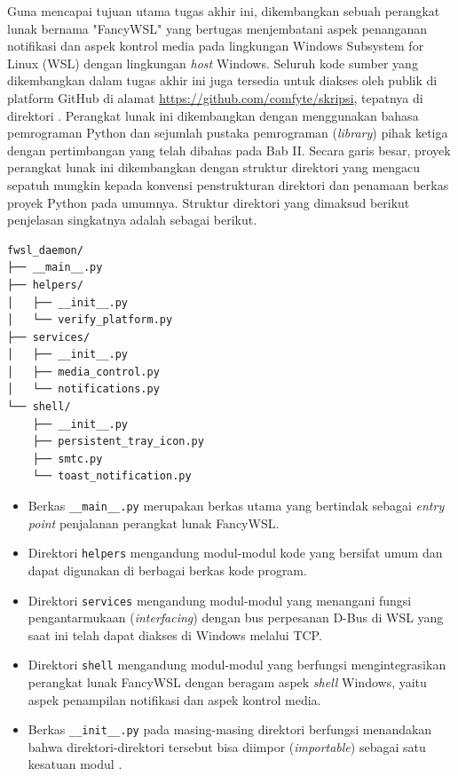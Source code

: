 Guna mencapai tujuan utama tugas akhir ini, dikembangkan sebuah perangkat lunak bernama "FancyWSL" yang bertugas menjembatani aspek penanganan notifikasi dan aspek kontrol media pada lingkungan Windows Subsystem for Linux (WSL) dengan lingkungan \textit{host} Windows. Seluruh kode sumber yang dikembangkan dalam tugas akhir ini juga tersedia untuk diakses oleh publik di platform GitHub di alamat \href{https://github.com/comfyte/skripsi}{https://github.com/comfyte/skripsi}, tepatnya di direktori . Perangkat lunak ini dikembangkan dengan menggunakan bahasa pemrograman Python dan sejumlah pustaka pemrograman (\textit{library}) pihak ketiga dengan pertimbangan yang telah dibahas pada Bab II. Secara garis besar, proyek perangkat lunak ini dikembangkan dengan struktur direktori yang mengacu sepatuh mungkin kepada konvensi penstrukturan direktori dan penamaan berkas proyek Python pada umumnya. Struktur direktori yang dimaksud berikut penjelasan singkatnya adalah sebagai berikut.

\begin{verbatim}
fwsl_daemon/
├── __main__.py
├── helpers/
│   ├── __init__.py
│   └── verify_platform.py
├── services/
│   ├── __init__.py
│   ├── media_control.py
│   └── notifications.py
└── shell/
    ├── __init__.py
    ├── persistent_tray_icon.py
    ├── smtc.py
    └── toast_notification.py
\end{verbatim}

\begin{itemize}
    \item Berkas \verb|__main__.py| merupakan berkas utama yang bertindak sebagai \textit{entry point} penjalanan perangkat lunak FancyWSL.

    \item Direktori \verb|helpers| mengandung modul-modul kode yang bersifat umum dan dapat digunakan di berbagai berkas kode program.

    \item Direktori \verb|services| mengandung modul-modul yang menangani fungsi pengantarmukaan (\textit{interfacing}) dengan bus perpesanan D-Bus di WSL yang saat ini telah dapat diakses di Windows melalui TCP.

    \item Direktori \verb|shell| mengandung modul-modul yang berfungsi mengintegrasikan perangkat lunak FancyWSL dengan beragam aspek \textit{shell} Windows, yaitu aspek penampilan notifikasi dan aspek kontrol media.

    \item Berkas \verb|__init__.py| pada masing-masing direktori berfungsi menandakan bahwa direktori-direktori tersebut bisa diimpor (\textit{importable}) sebagai satu kesatuan modul \cite{oliphant2007python}.
\end{itemize}

